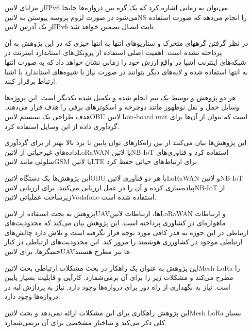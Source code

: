 از مزایای ‌لاتین{IPv6} می‌توان به زمانی اشاره کرد که یک گره بین دروازه‌ها جابجا می‌شود در صورت لزوم پروسه پیوستن به ‌لاتین{NS} را انجام می‌دهد که صورت استفاده از یک آدرس ‌لاتین{IPv6} ثابت اتصال تضمین خواهد شد.

در نظر گرفتن گرههای متحرک و سناریوهای انتها به انتها چیزی که در این پژوهش به آن پرداخته نشده است. اهمیت اصلی استفاده از پروتکل‌های استاندارد اینترنت در شبکه‌های اینترنت اشیا
در واقع ارزش خود را زمانی نشان خواهد داد که به صورت انتها به انتها استفاده شده و لایه‌های دیگر بتوانند در صورت نیاز با شیوه‌های استاندارد با اشیا ارتباط برقرار کنند.



هر دو پژوهش  و  توسط یک تیم انجام شده و تکمیل شده یکدیگر است. این پروژه‌ها وسایل حمل و نقل نوظهور مانند دوچرخه و اسکوترهای برقی را هدف قرار می‌دهند.
هدف طراحی یک سیستم ‌لاتین{OBU} یا ‌لاتین{on-board unit} است که بتوان از آن‌ها برای گردآوری داده از این وسایل استفاده کرد.

این پژوهش‌ها بیان می‌کنند از بین راه‌کارهای توان پایین با برد بالا بهتر از برای گردآوری داده‌های غیرحیاتی از ‌لاتین{LoRaWAN} یا ‌لاتین{NB-IoT} استفاده کرد
و فناوری‌های سلولی مانند ‌لاتین{GSM} یا ‌لاتین{LTE} برای ارتباط‌های حیاتی حفظ کرد.

این پژوهش‌ها یک دستگاه ‌لاتین{OBU} با هر دو فناوری ‌لاتین{LoRaWAN} و ‌لاتین{NB-IoT} پیاده‌سازی کرده و آن را در عمل ارزیابی می‌کنند.
برای ارزیابی ‌لاتین{NB-IoT} از زیرساخت عملیاتی ‌لاتین{Vodafone} استفاده شده است.


پژوهش  به بحث استفاده از ‌لاتین{UAV}ها، ارتباطات ‌لاتین{LoRaWAN} و ارتباطات ماهواره‌ای در کشاوری پرداخته است.
این پژوهش بیان می‌کند که محدودیت‌های ارتباطی در این حوزه به قدر کافی مورد توجه قرار نگرفته است و تلاش دارد چالش‌های ارتباطی موجود در کشاورزی هوشمند را مرور کند.
این محدودیت‌های ارتباطی در کنار حسگرها، برای ‌لاتین{UAV}ها نیز مطرح هستند.

این پژوهش به عنوان یک راهکار در بحث مشکلات ارتباطی بحث ‌لاتین{Mesh LoRa} را مطرح می‌کند و مشکلات زیر را برای آن برمی‌شمارد.
 کارآیی و قابلیت بسیار پایین است.
 نیاز به نگهداری از راه دور برای دروازه‌ها وجود دارد.
 نیاز به پردازش لبه در دروازه‌ها وجود دارد.

این پژوهش راهکاری برای این مشکلات ارائه نمی‌دهد و بحث ‌لاتین{Mesh LoRa} بسیار کلی ذکر می‌کند و ساختار مشخصی برای آن برنمی‌شمارد.

